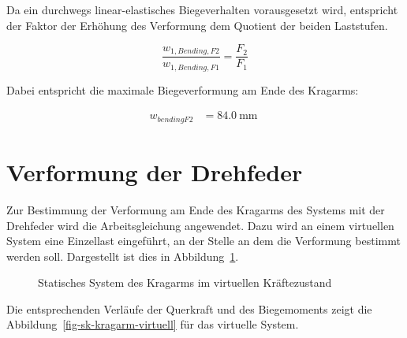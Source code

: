\documentclass[
  11pt,
  letterpaper,
]{scrreprt}
\begin{document}
Da ein durchwegs linear-elastisches Biegeverhalten vorausgesetzt wird,
entspricht der Faktor der Erhöhung des Verformung dem Quotient der
beiden Laststufen.

\[
\frac{w_{1,Bending,F2}}{w_{1,Bending,F1}} = \frac{F_2}{F_1}
\]

Dabei entspricht die maximale Biegeverformung am Ende des Kragarms:

$$
\begin{aligned}
w_{bendingF2} &= 84.0\ \mathrm{mm} \;
\end{aligned}
$$

\section{Verformung der Drehfeder}\label{verformung-der-drehfeder}

Zur Bestimmung der Verformung am Ende des Kragarms des Systems mit der
Drehfeder wird die Arbeitsgleichung angewendet. Dazu wird an einem
virtuellen System eine Einzellast eingeführt, an der Stelle an dem die
Verformung bestimmt werden soll. Dargestellt ist dies in
Abbildung~\ref{fig-kragarm-sys-virtuell}.

\begin{figure}[H]


\caption{\label{fig-kragarm-sys-virtuell}Statisches System des Kragarms
im virtuellen Kräftezustand}

\end{figure}%

Die entsprechenden Verläufe der Querkraft und des Biegemoments zeigt die
Abbildung~\ref{fig-sk-kragarm-virtuell} für das virtuelle System.
\end{document}
